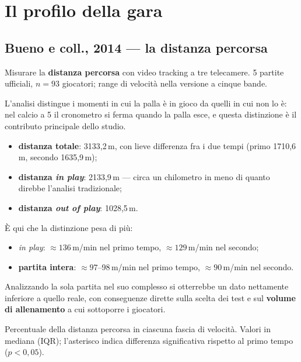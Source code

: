 \section{Il profilo della gara}

\subsection{Bueno e coll., 2014 --- la distanza percorsa}

Misurare la \textbf{distanza percorsa} con video tracking a tre telecamere. 5 partite ufficiali,
$n = 93$ giocatori; range di velocità nella versione a cinque bande.

L'analisi distingue i momenti in cui la palla è in gioco da quelli in cui non lo è: nel calcio a 5
il cronometro si ferma quando la palla esce, e questa distinzione è il contributo principale dello
studio.
\begin{itemize}
  \item \textbf{distanza totale}: 3133,2\,m, con lieve differenza fra i due tempi (primo 1710,6\,m,
    secondo 1635,9\,m);
  \item \textbf{distanza \textit{in play}}: 2133,9\,m --- circa un chilometro in meno di quanto
    direbbe l'analisi tradizionale;
  \item \textbf{distanza \textit{out of play}}: 1028,5\,m.
\end{itemize}

È qui che la distinzione pesa di più:
\begin{itemize}
  \item \textit{in play}: $\approx 136$\,m/min nel primo tempo, $\approx 129$\,m/min nel secondo;
  \item \textbf{partita intera}: $\approx 97$--98\,m/min nel primo tempo, $\approx 90$\,m/min nel
    secondo.
\end{itemize}
Analizzando la sola partita nel suo complesso si otterrebbe un dato nettamente inferiore a quello
reale, con conseguenze dirette sulla scelta dei test e sul \textbf{volume di allenamento} a cui
sottoporre i giocatori.

Percentuale della distanza percorsa in ciascuna fascia di velocità. Valori in mediana (IQR);
l'asterisco indica differenza significativa rispetto al primo tempo ($p < 0{,}05$).

